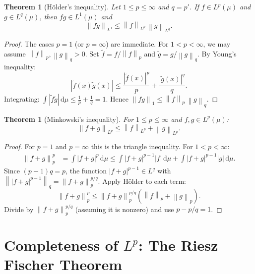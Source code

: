 \documentclass[a4paper,12pt]{book}
\newcommand{\dd}{\mathrm{d}}
\newcommand{\norm}[1]{\left\| #1 \right\|}
\newcommand{\abs}[1]{\left| #1 \right|}
\theoremstyle{definition}
\theoremstyle{plain}
\newtheorem{theorem}[definition]{Theorem}
\theoremstyle{remark}
\begin{document}
\begin{theorem}[H\"older's inequality]\label{thm:holder}
Let $1 \le p \le \infty$ and $q = p'$. If $f \in L^p(\mu)$ and $g \in L^q(\mu)$,
then $fg \in L^1(\mu)$ and
\[
  \norm{fg}_{L^1} \le \norm{f}_{L^p}\, \norm{g}_{L^q}.
\]
\end{theorem}

\begin{proof}
The cases $p = 1$ (or $p = \infty$) are immediate. For $1 < p < \infty$, we may
assume $\norm{f}_p, \norm{g}_q > 0$. Set $\tilde{f} = f/\norm{f}_p$ and
$\tilde{g} = g/\norm{g}_q$. By Young's inequality:
\[
  \abs{\tilde{f}(x)\tilde{g}(x)} \le \frac{\abs{\tilde{f}(x)}^p}{p}
  + \frac{\abs{\tilde{g}(x)}^q}{q}.
\]
Integrating: $\int \abs{\tilde{f}\tilde{g}}\, \dd\mu \le \frac{1}{p} + \frac{1}{q} = 1$.
Hence $\norm{fg}_1 \le \norm{f}_p\, \norm{g}_q$.
\end{proof}

\begin{theorem}[Minkowski's inequality]\label{thm:minkowski}
For $1 \le p \le \infty$ and $f, g \in L^p(\mu)$:
\[
  \norm{f + g}_{L^p} \le \norm{f}_{L^p} + \norm{g}_{L^p}.
\]
\end{theorem}

\begin{proof}
For $p = 1$ and $p = \infty$ this is the triangle inequality. For $1 < p < \infty$:
\begin{align*}
  \norm{f+g}_p^p
  &= \int \abs{f+g}^p\, \dd\mu
  \le \int \abs{f+g}^{p-1}\abs{f}\, \dd\mu + \int \abs{f+g}^{p-1}\abs{g}\, \dd\mu.
\end{align*}
Since $(p-1)q = p$, the function $\abs{f+g}^{p-1} \in L^q$ with
$\norm{\abs{f+g}^{p-1}}_q = \norm{f+g}_p^{p/q}$. Apply H\"older to each term:
\[
  \norm{f+g}_p^p \le \norm{f+g}_p^{p/q}(\norm{f}_p + \norm{g}_p).
\]
Divide by $\norm{f+g}_p^{p/q}$ (assuming it is nonzero) and use $p - p/q = 1$.
\end{proof}


\section{Completeness of $L^p$: The Riesz--Fischer Theorem}
\label{sec:Lp-completeness}

\end{document}
